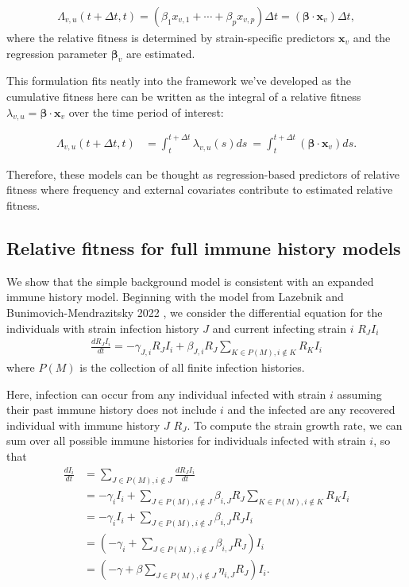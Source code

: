 \documentclass[11pt,oneside,letterpaper]{article}
\renewcommand{\vec}[1]{\boldsymbol{#1}}
\newcommand{\varEscape}{\eta}
\begin{document}
\begin{align}
    \Lambda_{v,u}(t + \Delta t,t) = (\beta_{1} x_{v,1} + \cdots + \beta_{p} x_{v, p})\Delta t = (\vec{\beta} \cdot \vec{x}_{v}) \Delta t,
\end{align}
where the relative fitness is determined by strain-specific predictors $\vec{x}_{v}$ and the regression parameter $\vec{\beta}_{v}$ are estimated.

This formulation fits neatly into the framework we've developed as the cumulative fitness here can be written as the integral of a relative fitness $\lambda_{v, u} =  \vec{\beta} \cdot \vec{x}_{v}$ over the time period of interest:

\begin{align}
    \Lambda_{v,u}(t + \Delta t,t)  &= \int_{t}^{t+\Delta t} \lambda_{v,u}(s)ds\ = \int_{t}^{t + \Delta t} (\vec{\beta} \cdot \vec{x}_{v}) ds.
\end{align}

Therefore, these models can be thought as regression-based predictors of relative fitness where frequency and external covariates contribute to estimated relative fitness.

\subsection{Relative fitness for full immune history models}\label{ssec:full_immune_history}

We show that the simple background model is consistent with an expanded immune history model.
Beginning with the model from Lazebnik and Bunimovich-Mendrazitsky 2022 \cite{Lazebnik2022}, we consider the differential equation for the individuals with strain infection history $J$ and current infecting strain $i$ $R_{J}I_{i}$
\begin{align}
\frac{dR_{J} I_{i}}{dt} = - \gamma_{J, i} R_{J} I_{i} + \beta_{J, i} R_{J} \sum_{K \in P(M), i\notin K} R_{K}I_{i}
\end{align}
where $P(M)$ is the collection of all finite infection histories.

Here, infection can occur from any individual infected with strain $i$ assuming their past immune history does not include $i$ and the infected are any recovered individual with immune history $J$  $R_{J}$.
To compute the strain growth rate, we can sum over all possible immune histories for individuals infected with strain $i$, so that
\begin{align}
    \frac{d I_{i}}{d t} &= \sum_{J \in P(M), i \notin J} \frac{dR_{J} I_{i}}{dt} \\
                        &= - \gamma_{i} I_{i} + \sum_{J \in P(M), i \notin J} \beta_{i, J} R_{J} \sum_{K \in P(M), i\notin K} R_{K}I_{i}\\
                        &= - \gamma_{i} I_{i} + \sum_{J \in P(M), i \notin J} \beta_{i, J} R_{J} I_{i}\\
                        &= \left(-\gamma_{i} + \sum_{J \in P(M), i \notin J} \beta_{i,J} R_{J} \right) I_{i}\\
                        &= \left(-\gamma + \beta\sum_{J \in P(M), i \notin J} \varEscape_{i,J} R_{J} \right) I_{i}.\\
\end{align}
\end{document}
